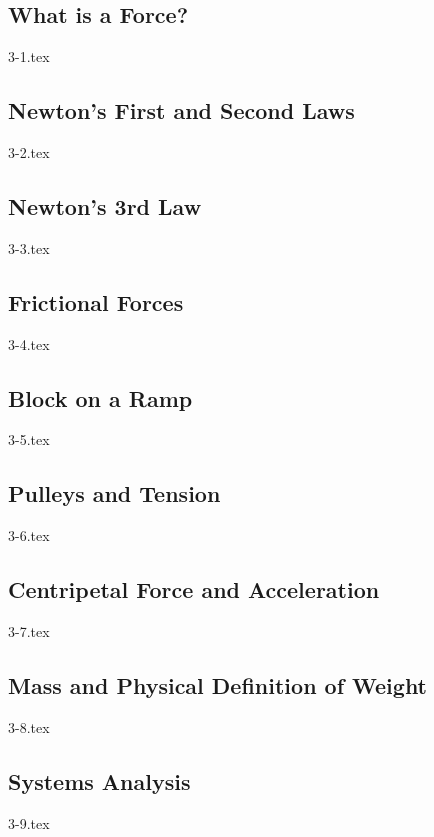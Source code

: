 \subsection{What is a Force?}

{3-1.tex}

\subsection{Newton's First and Second Laws}

{3-2.tex}

\subsection{Newton's 3rd Law}

{3-3.tex}

\subsection{Frictional Forces}

{3-4.tex}

\subsection{Block on a Ramp}

{3-5.tex}

\subsection{Pulleys and Tension}

{3-6.tex}

\subsection{Centripetal Force and Acceleration}

{3-7.tex}

\subsection{Mass and Physical Definition of Weight}

{3-8.tex}

\subsection{Systems Analysis}

{3-9.tex}